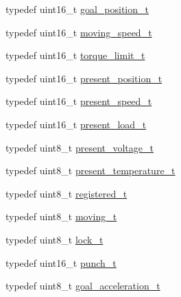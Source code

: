 \begin{DoxyCompactItemize}
\item 
typedef uint16\+\_\+t \hyperlink{structdynamixel_1_1servos_1_1_model_traits_3_01_mx12_01_4_1_1_c_t_a0ebd9566a31a8ff79d9242e26c333a09}{goal\+\_\+position\+\_\+t}
\item 
typedef uint16\+\_\+t \hyperlink{structdynamixel_1_1servos_1_1_model_traits_3_01_mx12_01_4_1_1_c_t_ab8cf05eeeb3e8b382c2a224c331e8abc}{moving\+\_\+speed\+\_\+t}
\item 
typedef uint16\+\_\+t \hyperlink{structdynamixel_1_1servos_1_1_model_traits_3_01_mx12_01_4_1_1_c_t_aa409267d672656e8a8931c9d4ca616b6}{torque\+\_\+limit\+\_\+t}
\item 
typedef uint16\+\_\+t \hyperlink{structdynamixel_1_1servos_1_1_model_traits_3_01_mx12_01_4_1_1_c_t_ad52479486b3317624d31dc41028bf8be}{present\+\_\+position\+\_\+t}
\item 
typedef uint16\+\_\+t \hyperlink{structdynamixel_1_1servos_1_1_model_traits_3_01_mx12_01_4_1_1_c_t_ad3c712d14c17625f60773301893db709}{present\+\_\+speed\+\_\+t}
\item 
typedef uint16\+\_\+t \hyperlink{structdynamixel_1_1servos_1_1_model_traits_3_01_mx12_01_4_1_1_c_t_afe97ec555842e0814f441ac9c8cf206b}{present\+\_\+load\+\_\+t}
\item 
typedef uint8\+\_\+t \hyperlink{structdynamixel_1_1servos_1_1_model_traits_3_01_mx12_01_4_1_1_c_t_aae81b10f39eb2d3ff969c97534511cec}{present\+\_\+voltage\+\_\+t}
\item 
typedef uint8\+\_\+t \hyperlink{structdynamixel_1_1servos_1_1_model_traits_3_01_mx12_01_4_1_1_c_t_a5654653438607313a5dc6d4fcdc6212d}{present\+\_\+temperature\+\_\+t}
\item 
typedef uint8\+\_\+t \hyperlink{structdynamixel_1_1servos_1_1_model_traits_3_01_mx12_01_4_1_1_c_t_a5c271458ecc0325c9e64bf1afce95d90}{registered\+\_\+t}
\item 
typedef uint8\+\_\+t \hyperlink{structdynamixel_1_1servos_1_1_model_traits_3_01_mx12_01_4_1_1_c_t_a204586661175bf516a89874f8d3b2464}{moving\+\_\+t}
\item 
typedef uint8\+\_\+t \hyperlink{structdynamixel_1_1servos_1_1_model_traits_3_01_mx12_01_4_1_1_c_t_a0ff0cce27be6d9aeec399e18e15c0e2c}{lock\+\_\+t}
\item 
typedef uint16\+\_\+t \hyperlink{structdynamixel_1_1servos_1_1_model_traits_3_01_mx12_01_4_1_1_c_t_a4654c3ef9cef0e0a275daedc41cd3c4a}{punch\+\_\+t}
\item 
typedef uint8\+\_\+t \hyperlink{structdynamixel_1_1servos_1_1_model_traits_3_01_mx12_01_4_1_1_c_t_aac5d665a0f8e526de1e34bae8bb0002a}{goal\+\_\+acceleration\+\_\+t}
\end{DoxyCompactItemize}
